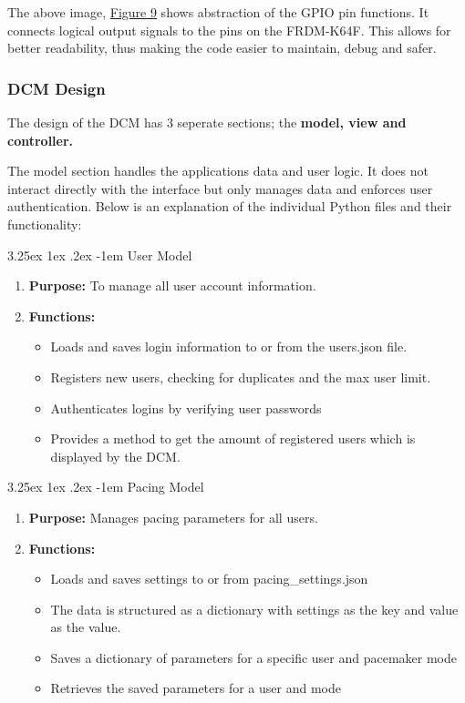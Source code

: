 \documentclass{article}
\makeatletter
\newcounter{subsubsubsection}[subsubsection]
\renewcommand\paragraph{\@startsection{paragraph}{5}{\z@}%
  {3.25ex \@plus1ex \@minus.2ex}%
  {-1em}%
  {\normalfont\normalsize\bfseries}}
\makeatother
\begin{document}
The above image, \hyperref[HardHide]{Figure 9} shows abstraction of the GPIO pin functions. 
It connects logical output signals to the pins on the FRDM-K64F. This allows for better readability,
thus making the code easier to maintain, debug and safer. 

\newpage
\subsubsection{DCM Design}

The design of the DCM has 3 seperate sections; the \textbf{model, view and controller.} 

The model section handles the applications data and user logic. It does not interact directly with the interface but 
only manages data and enforces user authentication. Below is an explanation of the individual Python files and their 
functionality:

\paragraph{User Model}
\begin{enumerate}[label=]
    \item \textbf{Purpose:} To manage all user account information.
    \item \textbf{Functions:}
    \begin{itemize}
        \item Loads and saves login information to or from the users.json file.
        \item Registers new users, checking for duplicates and the max user limit.
        \item Authenticates logins by verifying user passwords
        \item Provides a method to get the amount of registered users which is displayed by the DCM.
    \end{itemize}
\end{enumerate}

\paragraph{Pacing Model}
\begin{enumerate}[label=]
    \item \textbf{Purpose:} Manages pacing parameters for all users.
    \item \textbf{Functions:}
    \begin{itemize}
        \item Loads and saves settings to or from pacing\_settings.json
        \item The data is structured as a dictionary with settings as the key and value as the value.
        \item Saves a dictionary of parameters for a specific user and pacemaker mode
        \item Retrieves the saved parameters for a user and mode
    \end{itemize}
\end{enumerate}
\end{document}
